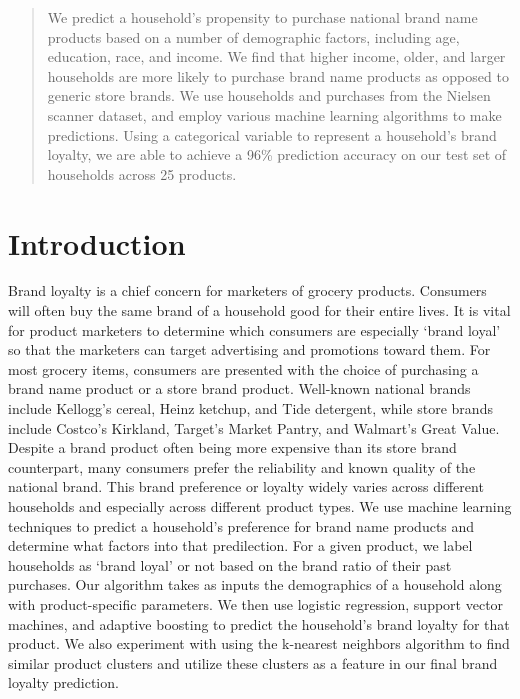 \documentclass[conference]{IEEEtran}
\begin{document}
\begin{abstract}
We predict a household’s propensity to purchase national brand name products based on a number of demographic factors, including age, education, race, and income. We find that higher income, older, and larger households are more likely to purchase brand name products as opposed to generic store brands. We use households and purchases from the Nielsen scanner dataset, and employ various machine learning algorithms to make predictions. Using a categorical variable to represent a household’s brand loyalty, we are able to achieve a 96\% prediction accuracy on our test set of households across 25 products.
\end{abstract}



%
\IEEEpeerreviewmaketitle



\section{Introduction}
Brand loyalty is a chief concern for marketers of grocery products. Consumers will often buy the same brand of a household good for their entire lives. It is vital for product marketers to determine which consumers are especially ‘brand loyal’ so that the marketers can target advertising and promotions toward them. 
For most grocery items, consumers are presented with the choice of purchasing a brand name product or a store brand product. Well-known national brands include Kellogg’s cereal, Heinz ketchup, and Tide detergent, while store brands include Costco’s Kirkland, Target’s Market Pantry, and Walmart’s Great Value. Despite a brand product often being more expensive than its store brand counterpart, many consumers prefer the reliability and known quality of the national brand. This brand preference or loyalty widely varies across different households and especially across different product types. We use machine learning techniques to predict a household’s preference for brand name products and determine what factors into that predilection.
For a given product, we label households as ‘brand loyal’ or not based on the brand ratio of their past purchases. Our algorithm takes as inputs the demographics of a household along with product-specific parameters. We then use logistic regression, support vector machines, and adaptive boosting to predict the household’s brand loyalty for that product. We also experiment with using the k-nearest neighbors algorithm to find similar product clusters and utilize these clusters as a feature in our final brand loyalty prediction.
\end{document}
